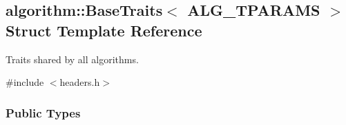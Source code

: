 \hypertarget{structalgorithm_1_1BaseTraits}{}\subsection{algorithm\+:\+:Base\+Traits$<$ A\+L\+G\+\_\+\+T\+P\+A\+R\+A\+MS $>$ Struct Template Reference}
\label{structalgorithm_1_1BaseTraits}


Traits shared by all algorithms.  




{\ttfamily \#include $<$headers.\+h$>$}

\subsubsection*{Public Types}
